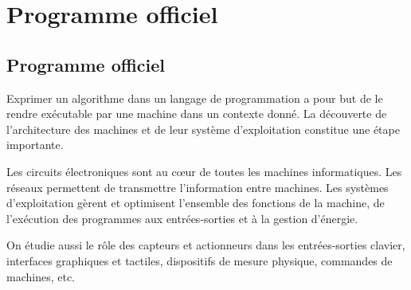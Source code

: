 \chapter*{Programme officiel}

\section*{Programme officiel}

Exprimer un algorithme dans un langage de programmation a pour but de le rendre exécutable par une machine dans un contexte donné. La découverte de l'architecture des machines et de leur système d'exploitation constitue une étape importante.

Les circuits électroniques sont au cœur de toutes les machines informatiques. Les réseaux permettent de transmettre l'information entre machines. Les systèmes d'exploitation gèrent et optimisent l'ensemble des fonctions de la machine, de l'exécution des programmes aux entrées-sorties et à la gestion d'énergie.

On étudie aussi le rôle des capteurs et actionneurs dans les entrées-sorties clavier, interfaces graphiques et tactiles, dispositifs de mesure physique, commandes de machines, etc.

